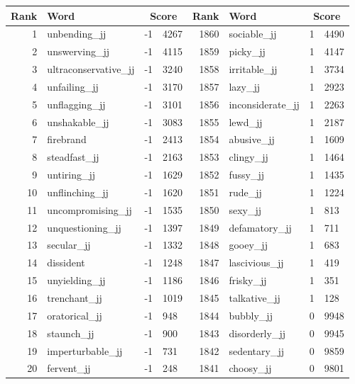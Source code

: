 \begin{table}[tbp]
    \begin{tabular}{| rlr@{.}l | rlr@{.}l |}
    \hline
    \textbf{Rank} & \textbf{Word} & \multicolumn{2}{c|}{\textbf{Score}} & \textbf{Rank} & \textbf{Word} & \multicolumn{2}{c|}{\textbf{Score}} \\
    \hline
    1 & unbending\_jj & -1 & 4267    &    1860 & sociable\_jj & 1 & 4490 \\
    2 & unswerving\_jj & -1 & 4115    &    1859 & picky\_jj & 1 & 4147 \\
    3 & ultraconservative\_jj & -1 & 3240    &    1858 & irritable\_jj & 1 & 3734 \\
    4 & unfailing\_jj & -1 & 3170    &    1857 & lazy\_jj & 1 & 2923 \\
    5 & unflagging\_jj & -1 & 3101    &    1856 & inconsiderate\_jj & 1 & 2263 \\
    6 & unshakable\_jj & -1 & 3083    &    1855 & lewd\_jj & 1 & 2187 \\
    7 & firebrand & -1 & 2413    &    1854 & abusive\_jj & 1 & 1609 \\
    8 & steadfast\_jj & -1 & 2163    &    1853 & clingy\_jj & 1 & 1464 \\
    9 & untiring\_jj & -1 & 1629    &    1852 & fussy\_jj & 1 & 1435 \\
    10 & unflinching\_jj & -1 & 1620    &    1851 & rude\_jj & 1 & 1224 \\
    11 & uncompromising\_jj & -1 & 1535    &    1850 & sexy\_jj & 1 & 813 \\
    12 & unquestioning\_jj & -1 & 1397    &    1849 & defamatory\_jj & 1 & 711 \\
    13 & secular\_jj & -1 & 1332    &    1848 & gooey\_jj & 1 & 683 \\
    14 & dissident & -1 & 1248    &    1847 & lascivious\_jj & 1 & 419 \\
    15 & unyielding\_jj & -1 & 1186    &    1846 & frisky\_jj & 1 & 351 \\
    16 & trenchant\_jj & -1 & 1019    &    1845 & talkative\_jj & 1 & 128 \\
    17 & oratorical\_jj & -1 & 948    &    1844 & bubbly\_jj & 0 & 9948 \\
    18 & staunch\_jj & -1 & 900    &    1843 & disorderly\_jj & 0 & 9945 \\
    19 & imperturbable\_jj & -1 & 731    &    1842 & sedentary\_jj & 0 & 9859 \\
    20 & fervent\_jj & -1 & 248    &    1841 & choosy\_jj & 0 & 9801 \\

\end{tabular}
\end{table}
